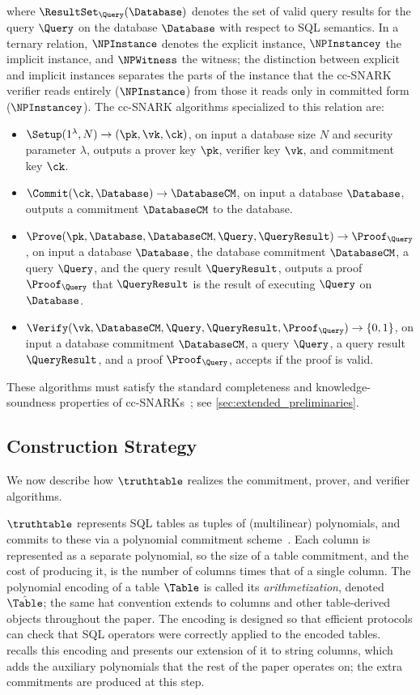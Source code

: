 \noindent
where $\ResultSet_\Query(\Database)$ denotes the set of valid query results for the query $\Query$ on the database $\Database$ with respect to SQL semantics.
In a ternary relation, $\NPInstance$ denotes the explicit instance, $\NPInstancey$ the implicit instance, and $\NPWitness$ the witness; the distinction between explicit and implicit instances separates the parts of the instance that the cc-SNARK verifier reads entirely ($\NPInstance$) from those it reads only in committed form ($\NPInstancey$).
The cc-SNARK algorithms specialized to this relation are:
\begin{itemize}[nosep]
    \item $\Setup(1^\lambda, N) \rightarrow (\pk, \vk, \ck)$, on input a database size $N$ and security parameter $\lambda$, outputs a prover key $\pk$, verifier key $\vk$, and commitment key $\ck$.
    \item $\Commit(\ck, \Database) \rightarrow \DatabaseCM$, on input a database $\Database$, outputs a commitment $\DatabaseCM$ to the database.
    \item $\Prove(\pk, \Database, \DatabaseCM, \Query, \QueryResult) \rightarrow \Proof_\Query$, on input a database $\Database$, the database commitment $\DatabaseCM$, a query $\Query$, and the query result $\QueryResult$, outputs a proof $\Proof_\Query$ that $\QueryResult$ is the result of executing $\Query$ on $\Database$.
    \item $\Verify(\vk, \DatabaseCM, \Query, \QueryResult, \Proof_\Query) \rightarrow \{0,1\}$, on input a database commitment $\DatabaseCM$, a query $\Query$, a query result $\QueryResult$, and a proof $\Proof_\Query$, accepts if the proof is valid.
\end{itemize}
These algorithms must satisfy the standard completeness and knowledge-soundness properties of cc-SNARKs~\cite{CampanelliFQ19}; see \cref{sec:extended_preliminaries}.

\subsection{Construction Strategy}
\label{sec:overview:construction-strategy}

We now describe how $\truthtable$ realizes the commitment, prover, and verifier algorithms.

$\truthtable$ represents SQL tables as tuples of (multilinear) polynomials, and commits to these via a polynomial commitment scheme~\cite{KateZG10}.
Each column is represented as a separate polynomial, so the size of a table commitment, and the cost of producing it, is the number of columns times that of a single column.
The polynomial encoding of a table $\Table$ is called its \emph{arithmetization}, denoted $\hat{\Table}$; the same hat convention extends to columns and other table-derived objects throughout the paper.
The encoding is designed so that efficient protocols can check that SQL operators were correctly applied to the encoded tables.
 recalls this encoding and presents our extension of it to string columns, which adds the auxiliary polynomials that the rest of the paper operates on; the extra commitments are produced at this step.


